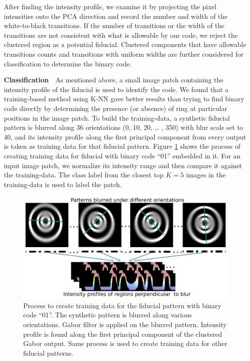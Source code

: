 \documentclass[10pt,twocolumn,letterpaper]{article}
\begin{document}
After finding the intensity profile, we examine it by
projecting the pixel intensities onto the PCA direction and record the
number and width of the white-to-black transitions.  If the number of transitions or the
width of the transitions are not consistent with what is allowable by
our code, we reject the clustered region as a potential fiducial.
Clustered components that have allowable transitions counts and transitions with
uniform widths are further considered for classification to determine
the binary code.

\noindent\textbf{Classification}~~As mentioned above, a small image patch
containing the intensity profile of the fiducial is used to identify the code.   We found
that a training-based method using K-NN gave better results than trying to
find binary code directly by determining the presence (or absence) of ring
at particular positions in the image patch. To build the training-data, a
synthetic fiducial pattern is blurred along 36 orientations (0, 10, 20, \ldots
, 350) with blur scale set to 40, and its intensity profile along the first
principal component from every output is taken as training data for that
fiducial pattern. Figure \ref{fig:training_data} shows the process of creating
training data for fiducial with binary code ``01'' embedded in it.  For an
input image patch, we normalize its intensity range and then compare it against
the training-data. The class label from the closest top $K=5$ images in the
training-data is used to label the patch.

\begin{figure}[h!]
\centering
  \includegraphics[width=0.95\linewidth]{training_data.pdf}
  \caption{Process to create training data for the fiducial pattern with binary
  code ``01''. The synthetic pattern is blurred along various orientations. Gabor
  filter is applied on the blurred pattern. Intensity profile is found along the
  first principal component of the clustered Gabor output. Same process is used
  to create training data for other fiducial patterns.}
  \label{fig:training_data}
\end{figure}
\end{document}
